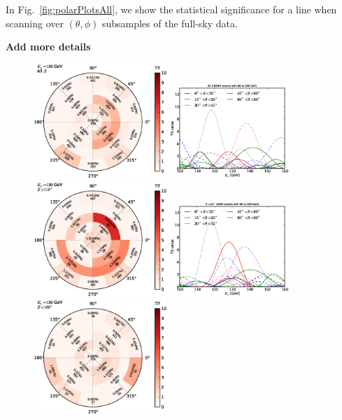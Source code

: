 \documentclass[aps,twocolumn,prd,superscriptaddress,showpacs,nofootinbib,fixfloat]{revtex4}
\begin{document}
In Fig.~\ref{fig:polarPlotsAll}, we show the statistical significance for a
line when scanning over $(\theta, \phi)$ subsamples of the full-sky data.

\textbf{Add more details}

\begin{figure}[p]
  \centering
  \includegraphics[width=0.45\textwidth]{plots/polar_all.eps}
  \includegraphics[width=0.40\textwidth]{plots/scan_all.eps}
  \includegraphics[width=0.45\textwidth]{plots/polar_z.GT.110.eps}
  \includegraphics[width=0.40\textwidth]{plots/scan_z.GT.110.eps}
  \includegraphics[width=0.45\textwidth]{plots/polar_z.LE.100.eps}

\end{figure}
\end{document}
